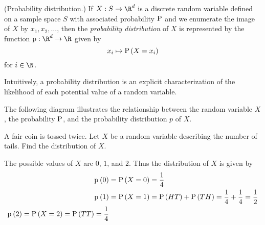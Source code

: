 \documentclass[11pt]{article}
\begin{document}
\begin{defn}{(Probability distribution.)}
    If $X : S \to \R^d$ is a discrete random variable defined on a sample space
    $S$ with associated probability $\operatorname{P}$ and we enumerate the image of $X$
    by $x_1, x_2, \ldots$, then the \emph{probability distribution} of $X$ is
    represented by the function $\prob : \R^d \to \R$ given by
    \begin{equation}
        \label{eq:probability-distribution}
        x_i \mapsto \P{X = x_i}
    \end{equation}
    for $i \in \N$.

    Intuitively, a probability distribution is an explicit characterization
    of the likelihood of each potential value of a random variable.

    The following diagram illustrates the relationship between the random
    variable $X$, the probability $\operatorname{P}$, and the probability distribution $p$
    of $X$.

    \begin{center}
    \end{center}
\end{defn}

\begin{eg}
    A fair coin is tossed twice. Let $X$ be a random variable describing the
    number of tails. Find the distribution of $X$.
\end{eg}

\begin{solution}
    The possible values of $X$ are $0$, $1$, and $2$. Thus the distribution of
    $X$ is given by
    \begin{align*}
        \p{0} &= \P{X = 0} = \frac{1}{4} \\
        \p{1} &= \P{X = 1}
            = \P{HT} + \P{TH} = \frac{1}{4} + \frac{1}{4} = \frac{1}{2} \\
        \p{2} = \P{X = 2} = \P{TT} = \frac{1}{4}
    \end{align*}
\end{solution}
\end{document}
